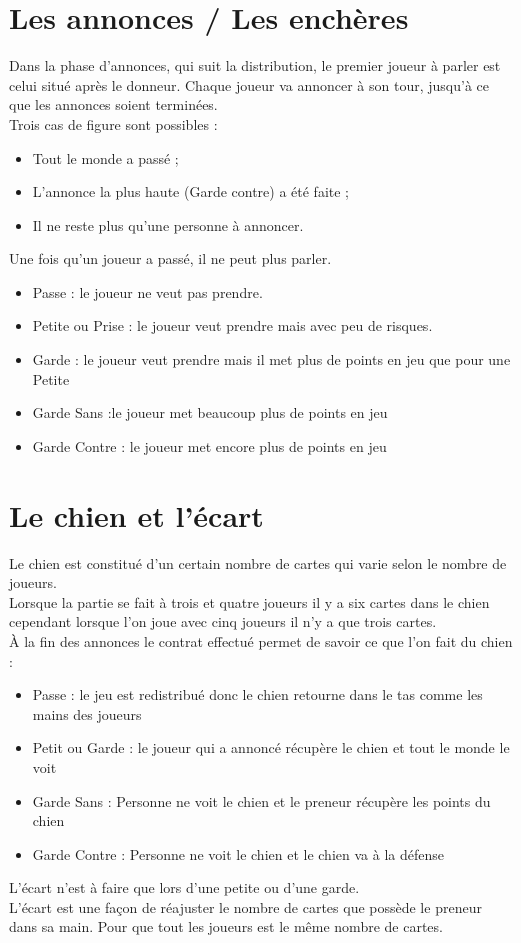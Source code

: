 \documentclass[a4paper]{report}
\begin{document}
	\section{Les annonces / Les enchères}
		
		Dans la phase d’annonces, qui suit la distribution, le premier joueur à parler est celui situé après le donneur. Chaque joueur va annoncer à son tour, jusqu’à ce que les 			annonces soient terminées.\\
			Trois cas de figure sont possibles :
		\begin{itemize}
				\item Tout le monde a passé ;
  				\item L’annonce la plus haute (Garde contre) a été faite ;
   				\item Il ne reste plus qu’une personne à annoncer.
		\end{itemize}
			Une fois qu’un joueur a passé, il ne peut plus parler.\\
		\begin{itemize}
   				\item Passe : le joueur ne veut pas prendre.
   				\item Petite ou Prise : le joueur veut prendre mais avec peu de risques.
   				\item Garde : le joueur veut prendre mais il met plus de points en jeu que pour une Petite
   				\item Garde Sans :le joueur met beaucoup plus de points en jeu
   				\item Garde Contre : le joueur met encore plus de points en jeu
		\end{itemize}
	\section{Le chien et l’écart }
		
		Le chien est constitué d’un certain nombre de cartes qui varie selon le nombre de joueurs.\\
		Lorsque la partie se fait à trois et quatre joueurs il y a six cartes dans le chien cependant lorsque l’on joue avec cinq joueurs il n’y a que trois cartes.\\
			À la fin des annonces le contrat effectué permet de savoir ce que l’on fait du chien :
		\begin{itemize}
		    	\item Passe : le jeu est redistribué donc le chien retourne dans le tas comme les mains des joueurs
		    	\item Petit ou Garde : le joueur qui a annoncé récupère le chien et tout le monde le voit
		  	  \item Garde Sans : Personne ne voit le chien et le preneur récupère les points du chien
		  	  \item Garde Contre : Personne ne voit le chien et le chien va à la défense
		\end{itemize}
			L’écart n’est à faire que lors d’une petite ou d’une garde.\\
		L’écart est une façon de réajuster le nombre de cartes que possède le preneur dans sa main. Pour que tout les joueurs est le même nombre de cartes.\\
\end{document}
